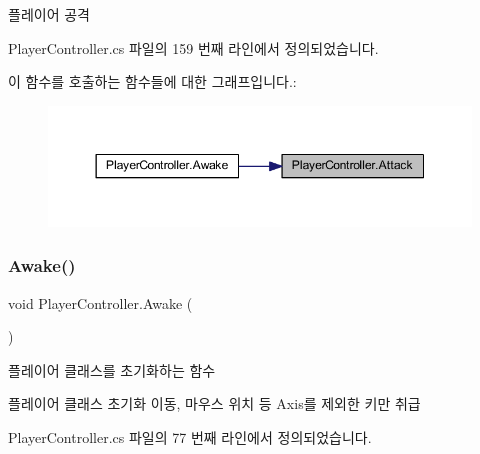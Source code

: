 플레이어 공격 



Player\+Controller.\+cs 파일의 159 번째 라인에서 정의되었습니다.


\begin{DoxyCode}{0}

\end{DoxyCode}
이 함수를 호출하는 함수들에 대한 그래프입니다.\+:\nopagebreak
\begin{figure}[H]
\begin{center}
\leavevmode
\includegraphics[width=350pt]{dc/dde/class_player_controller_a473a610cfe2a374d5cb39b3c44881d11_icgraph}
\end{center}
\end{figure}
\mbox{\label{class_player_controller_a050967f0e5c2340cb21861e4c8c788a1}} 
\subsubsection{\texorpdfstring{Awake()}{Awake()}}
{\footnotesize\ttfamily void Player\+Controller.\+Awake (\begin{DoxyParamCaption}{ }\end{DoxyParamCaption})\hspace{0.3cm}{\ttfamily [private]}}



플레이어 클래스를 초기화하는 함수 

플레이어 클래스 초기화 이동, 마우스 위치 등 Axis를 제외한 키만 취급 

Player\+Controller.\+cs 파일의 77 번째 라인에서 정의되었습니다.



